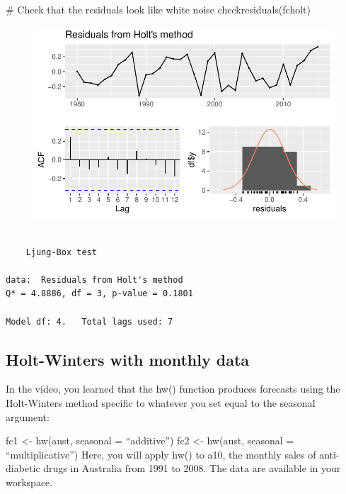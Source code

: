 \documentclass[
  letterpaper,
  DIV=11,
  numbers=noendperiod]{scrartcl}
\newenvironment{Shaded}{\begin{snugshade}}{\end{snugshade}}
\newcommand{\CommentTok}[1]{\textcolor[rgb]{0.37,0.37,0.37}{#1}}
\newcommand{\FunctionTok}[1]{\textcolor[rgb]{0.28,0.35,0.67}{#1}}
\newcommand{\NormalTok}[1]{\textcolor[rgb]{0.00,0.23,0.31}{#1}}
\begin{document}
\begin{Shaded}
\begin{Highlighting}[]
\CommentTok{\# Check that the residuals look like white noise}
\FunctionTok{checkresiduals}\NormalTok{(fcholt)}
\end{Highlighting}
\end{Shaded}

\begin{figure}[H]

{\centering \includegraphics{forecasting_datacamp_ex_files/figure-pdf/unnamed-chunk-14-2.pdf}

}

\end{figure}

\begin{verbatim}

    Ljung-Box test

data:  Residuals from Holt's method
Q* = 4.8886, df = 3, p-value = 0.1801

Model df: 4.   Total lags used: 7
\end{verbatim}

\hypertarget{holt-winters-with-monthly-data}{%
\subsection{Holt-Winters with monthly
data}\label{holt-winters-with-monthly-data}}

In the video, you learned that the hw() function produces forecasts
using the Holt-Winters method specific to whatever you set equal to the
seasonal argument:

fc1 \textless- hw(aust, seasonal = ``additive'') fc2 \textless- hw(aust,
seasonal = ``multiplicative'') Here, you will apply hw() to a10, the
monthly sales of anti-diabetic drugs in Australia from 1991 to 2008. The
data are available in your workspace.
\end{document}
